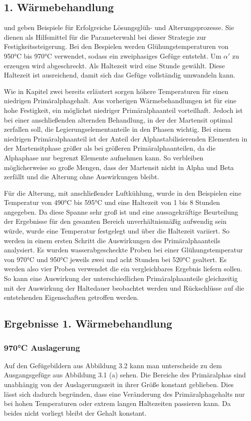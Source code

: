 \documentclass[a4paper, 11pt]{tubsreprt}
\begin{document}
\subsection{1. Wärmebehandlung}
\cite{Gilbert2004} und \cite{chen2008} geben Beispiele für Erfolgreiche Lösungsglüh- und Alterungsprozesse. Sie dienen als Hilfsmittel für die Parameterwahl bei dieser Strategie zur Festigkeitssteigerung. Bei den Bespielen werden Glühungstemperaturen von 950°C bis 970°C verwendet, sodass ein zweiphasiges Gefüge entsteht. Um $\alpha'$ zu erzeugen wird abgeschreckt. Als Haltezeit wird eine Stunde gewählt. Diese Haltezeit ist ausreichend, damit sich das Gefüge vollständig umwandeln kann.

Wie in Kapitel zwei bereits erläutert sorgen höhere Temperaturen für einen niedrigen Primäralphagehalt. Aus vorherigen Wärmebehandlungen ist für eine hohe Festigkeit, ein möglichst niedriger Primäralphaanteil vorteilhaft. Jedoch ist bei einer anschließenden alternden Behandlung, in der der Martensit optimal zerfallen soll, die Legierungselementanteile in den Phasen wichtig. Bei einem niedrigen Primäralphaanteil ist der Anteil der Alphastabilisierenden Elementen in der Martensitphase größer als bei größeren Primäralphaanteilen, da die Alphaphase nur begrenzt Elemente aufnehmen kann. So verbleiben möglicherweise so große Mengen, dass der Martensit nicht in Alpha und Beta zerfällt und die Alterung ohne Auswirkungen bleibt.

Für die Alterung, mit anschließender Luftkühlung, wurde in den Beispielen eine Temperatur von 490°C bis 595°C und eine Haltezeit von 1 bis 8 Stunden angegeben. Da diese Spanne sehr groß ist und eine aussagekräftige Beurteilung der Ergebnisse für den gesamten Bereich unverhältnismäßig aufwendig sein würde, wurde eine Temperatur festgelegt und über die Haltezeit variiert. So werden in einem ersten Schritt die Auswirkungen des Primäralphaanteils analysiert. Es wurden wasserabgescheckte Proben bei einer Glühungstemperatur von 970°C und 950°C jeweils zwei und acht Stunden bei 520°C gealtert. Es werden also vier Proben verwendet die ein vergleichbares Ergebnis liefern sollen. So kann eine Auswirkung der unterschiedlichen Primäralphaanteile gleichzeitig mit der Auswirkung der Haltedauer beobachtet werden und Rückschlüsse auf die entstehenden Eigenschaften getroffen werden.
\subsection{Ergebnisse 1. Wärmebehandlung}
\subsubsection{970°C Auslagerung}
Auf den Gefügebildern aus Abbildung 3.2 kann man unterscheide zu dem Ausgangsgefüge aus Abbildung 3.1 (a) sehen. Die Bereiche des Primäralphas sind unabhängig von der Auslagerungszeit in ihrer Größe konstant geblieben. Dies lässt sich dadurch begründen, dass eine Veränderung des Primäralphagehalts nur bei hohen Temperaturen oder extrem langen Haltezeiten passieren kann. Da beides nicht vorliegt bleibt der Gehalt konstant.
\end{document}
